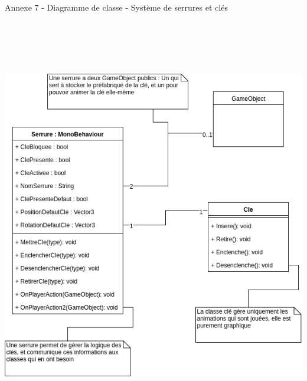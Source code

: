 \documentclass[a4paper]{article}
\begin{document}
    \vfill
    \huge Annexe 7 - Diagramme de classe - Système de serrures et clés \\
    \vspace{20pt}
    \includegraphics[width=16.5cm,height=19cm]{img/DiagClasseSerrures}
    \vfill

    \newpage
\end{document}
